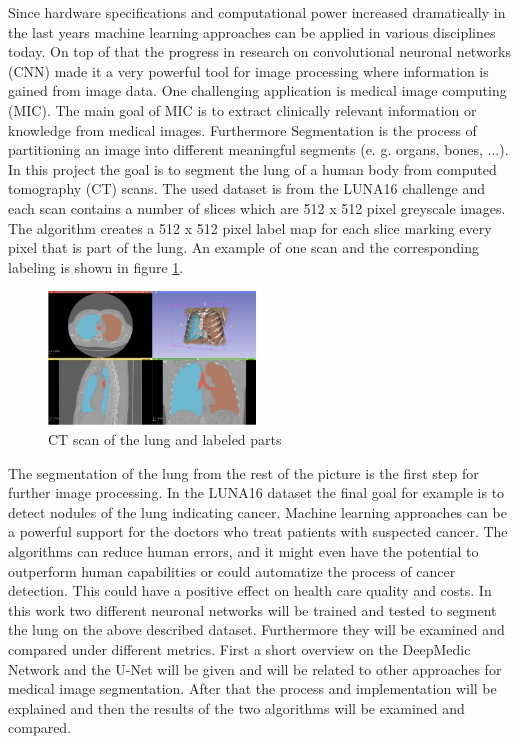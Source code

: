 
Since hardware specifications and computational power increased dramatically in the last years machine learning approaches can be applied in various disciplines today. On top of that the progress in research on convolutional neuronal networks (CNN) made it a very powerful tool for image processing where information is gained from image data.\newline
One challenging application is medical image computing (MIC). The main goal of MIC is to extract clinically relevant information or knowledge from medical images. Furthermore Segmentation is the process of partitioning an image into different meaningful segments (e. g. organs, bones, ...).\newline
In this project the goal is to segment the lung of a human body from computed tomography (CT) scans.\newline
The used dataset is from the LUNA16 challenge \cite{luna} and each scan contains a number of slices which are 512 x 512 pixel greyscale images. The algorithm creates a 512 x 512 pixel label map for each slice marking every pixel that is part of the lung. An example of one scan and the corresponding labeling is shown in figure \ref{scan_picture}.

\begin{figure}[h!]
	\includegraphics[width=0.49\textwidth, angle=0]{files/scan_picture.jpg}
	\caption{CT scan of the lung and labeled parts}
	\label{scan_picture}
\end{figure}

The segmentation of the lung from the rest of the picture is the first step for further image processing. In the LUNA16 dataset the final goal for example is to detect nodules of the lung indicating cancer. Machine learning approaches can be a powerful support for the doctors who treat patients with suspected cancer. The algorithms can reduce human errors, and it might even have the potential to outperform human capabilities or could automatize the process of cancer detection. This could have a positive effect on health care quality and costs.\newline
In this work two different neuronal networks will be trained and tested to segment the lung on the above described dataset. Furthermore they will be examined and compared under different metrics.\newline
First a short overview on the DeepMedic Network and the U-Net will be given and will be related to other approaches for medical image segmentation. After that the process and implementation will be explained and then the results of the two algorithms will be examined and compared.
